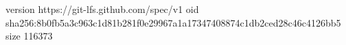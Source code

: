 version https://git-lfs.github.com/spec/v1
oid sha256:8b0fb5a3c963c1d81b281f0e29967a1a17347408874c1db2ced28c46c4126bb5
size 116373
